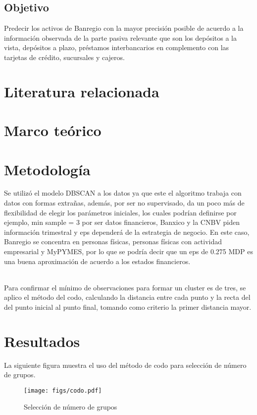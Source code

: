 \documentclass{article}
\begin{document}
\subsection{Objetivo}

Predecir los activos de Banregio con la mayor precisión posible de acuerdo a la información observada de la parte pasiva relevante que son los depósitos a la vista, depósitos a plazo, préstamos interbancarios en complemento con las tarjetas de crédito, sucursales y cajeros.


\section{Literatura relacionada}

\section{Marco teórico}

\section{Metodología}

Se utilizó el modelo DBSCAN a los datos ya que este el algoritmo trabaja con datos con formas extrañas, además, por ser no supervisado, da un poco más de flexibilidad de elegir los parámetros iniciales, los cuales podrían definirse por ejemplo, min sample = 3 por ser datos financieros, Banxico y la CNBV piden información trimestral y eps dependerá de la estrategia de negocio. En este caso, Banregio se concentra en personas físicas, personas físicas con actividad empresarial y MyPYMES, por lo que se podría decir que un eps de 0.275 MDP es una buena aproximación de acuerdo a los estados financieros. 

\\

Para confirmar el mínimo de observaciones para formar un cluster es de tres, se aplico el método del codo, calculando la distancia entre cada punto y la recta del del punto inicial al punto final, tomando como criterio la primer distancia mayor.


\section{Resultados}

La siguiente figura muestra el uso del método de codo para selección de número de grupos.
\\
\begin{figure}
    \centering
    \texttt{[image: figs/codo.pdf]}
    \caption{Selección de número de grupos}
    \label{fig:Método de codo}
\end{figure}
\end{document}
